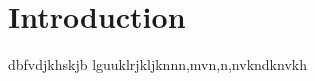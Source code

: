 \chapter{Introduction}
\label{ChapterIntroduction}
%
dbfvdjkhskjb lguuklrjkljknnn,mvn,n,nvkndknvkh

